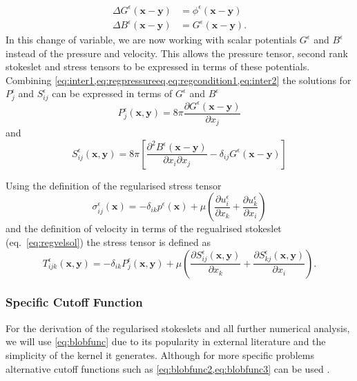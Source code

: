 \begin{subequations}
\label{eq:intermediate}
\begin{align}
    \Delta G^\epsilon(\bm{x}-\bm{y})  &= \phi^\epsilon(\bm{x}-\bm{y}) \label{eq:inter1} \\
    \Delta B^\epsilon(\bm{x}-\bm{y})  &= G^\epsilon(\bm{x}-\bm{y}). \label{eq:inter2}
\end{align}
\end{subequations}
In this change of variable, we are now working with scalar potentials $G^\epsilon$ and $B^\epsilon$ instead of the pressure and velocity. This allows the pressure tensor, second rank stokeslet and stress tensors to be expressed in terms of these potentials. Combining \cref{eq:inter1,eq:regpressureeq,eq:regcondition1,eq:inter2} the solutions for $P^\epsilon_j$ and $S^\epsilon_{ij}$ can be expressed in terms of $G^\epsilon$ and $B^\epsilon$
\begin{equation}
\label{eq:pressuresol}
    P^\epsilon_{j}(\bm{x},\bm{y}) = 8 \pi \frac{\partial G^\epsilon(\bm{x}-\bm{y})}{\partial x_j}
\end{equation}
and
\begin{equation}
\label{eq:regstokeslet1}
    S_{ij}^\epsilon(\bm{x}, \bm{y}) = 8\pi\left[ \frac{\partial^2 B^\epsilon(\bm{x} -\bm{y})}{\partial x_i \partial x_j} - \delta_{ij}  G^\epsilon(\bm{x} -\bm{y})\right]
\end{equation}

Using the definition of the regularised stress tensor 
\begin{equation}
\label{eq:regstress}
    \sigma_{ij}^\epsilon(\bm{x}) = -\delta_{ik}p^\epsilon(\bm{x}) + \mu\left( \frac{\partial u^\epsilon_i}{\partial x_k} + \frac{\partial u^\epsilon_k}{\partial x_i} \right)
\end{equation}
and the definition of velocity in terms of the regualrised stokeslet (eq.~\ref{eq:regvelsol}) the stress tensor is defined as
\begin{equation}
\label{eq:regDoubleLayerSol}
    T^\epsilon_{ijk}(\bm{x},\bm{y}) = -\delta_{ik} P^\epsilon_j(\bm{x},\bm{y}) + \mu\left( \frac{\partial S^\epsilon_{ij}(\bm{x},\bm{y})}{\partial x_k} + \frac{\partial S^\epsilon_{kj}(\bm{x},\bm{y})}{\partial x_i}\right).
\end{equation}

\subsubsection{Specific Cutoff Function}
For the derivation of the regularised stokeslets and all further numerical analysis, we will use \cref{eq:blobfunc} due to its popularity in external literature and the simplicity of the kernel it generates. Although for more specific problems alternative cutoff functions such as \cref{eq:blobfunc2,eq:blobfunc3} can be used \cite{Olson2013ModelingFormulation,Nguyen2014ReductionFlow,Zhao2019}.

